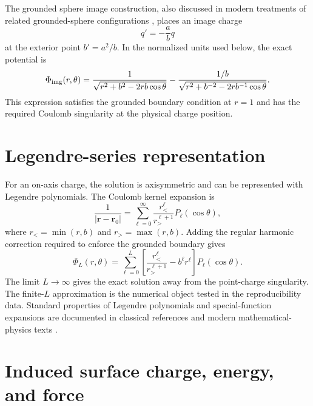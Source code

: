 \documentclass[preprint,12pt]{elsarticle}
\begin{document}
The grounded sphere image construction, also discussed in modern treatments of related grounded-sphere configurations \cite{deoliveira2012}, places an image charge
\begin{equation}
    q'=-\frac{a}{b}q
\end{equation}
at the exterior point $b'=a^2/b$. In the normalized units used below, the exact potential is
\begin{equation}
\Phi_{\rm img}(r,\theta)=
\frac{1}{\sqrt{r^2+b^2-2rb\cos\theta}}
-
\frac{1/b}{\sqrt{r^2+b^{-2}-2rb^{-1}\cos\theta}} .
\label{eq:image}
\end{equation}
This expression satisfies the grounded boundary condition at $r=1$ and has the required Coulomb singularity at the physical charge position.

\section{Legendre-series representation}\label{sec:legendre}

For an on-axis charge, the solution is axisymmetric and can be represented with Legendre polynomials. The Coulomb kernel expansion is
\begin{equation}
\frac{1}{|\mathbf r-\mathbf r_0|}=\sum_{\ell=0}^{\infty}
\frac{r_<^\ell}{r_>^{\ell+1}}P_\ell(\cos\theta),
\end{equation}
where $r_<=\min(r,b)$ and $r_>=\max(r,b)$. Adding the regular harmonic correction required to enforce the grounded boundary gives
\begin{equation}
\Phi_L(r,\theta)=\sum_{\ell=0}^{L}\left[
\frac{r_<^\ell}{r_>^{\ell+1}}-b^\ell r^\ell
\right]P_\ell(\cos\theta).
\label{eq:legendre_trunc}
\end{equation}
The limit $L\rightarrow\infty$ gives the exact solution away from the point-charge singularity. The finite-$L$ approximation is the numerical object tested in the reproducibility data. Standard properties of Legendre polynomials and special-function expansions are documented in classical references and modern mathematical-physics texts \cite{abramowitz1972,gradshteyn2007,szego1939,arfken2013}.

\section{Induced surface charge, energy, and force}\label{sec:observables}
\end{document}
